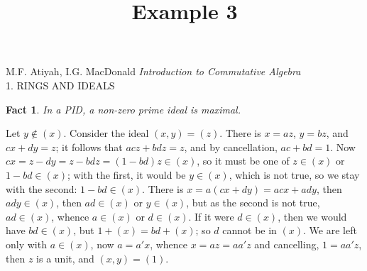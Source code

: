 \documentclass{article}
\title{Example 3}
\newtheorem*{fact}{Fact}
\begin{document}
\maketitle

\begin{center}
M.F. Atiyah, I.G. MacDonald \emph{Introduction to Commutative Algebra}\\
1. RINGS AND IDEALS
\end{center}

\vspace*{10px} 

\begin{fact}
In a PID, a non-zero prime ideal is maximal.
\end{fact}

\vspace*{10px} 

Let $y \notin (x)$. Consider the ideal $(x, y) = (z)$. There is $x = az$, $y = bz$, and $cx + dy = z$; it follows that $acz + bdz = z$, and by cancellation, $ac + bd = 1$. Now $cx = z - dy = z - bdz = (1 - bd)z \in (x)$, so it must be one of $z \in (x)$ or $1 - bd \in (x)$; with the first, it would be $y \in (x)$, which is not true, so we stay with the second: $1 - bd \in (x)$. There is $x = a(cx + dy) = acx + ady$, then $ady \in (x)$, then $ad \in (x)$ or $y \in (x)$, but as the second is not true, $ad \in (x)$, whence $a \in (x)$ or $d \in (x)$. If it were $d \in (x)$, then we would have $bd \in (x)$, but $1 + (x) = bd + (x)$; so $d$ cannot be in $(x)$. We are left only with $a \in (x)$, now $a = a'x$, whence $x = az = aa'z$ and cancelling, $1 = aa'z$, then $z$ is a unit, and $(x, y) = (1)$. 
\end{document}
